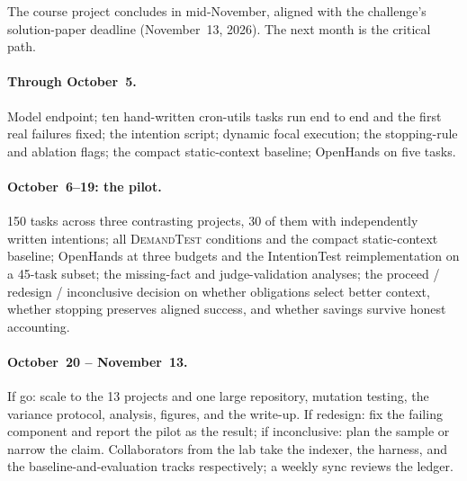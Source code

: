 \documentclass[sigconf,nonacm]{acmart}
\newcommand{\tool}{\textsc{DemandTest}\xspace}
\begin{document}
The course project concludes in mid-November, aligned with the challenge's solution-paper deadline (November~13, 2026). The next month is the critical path.

\paragraph{Through October~5.}
Model endpoint; ten hand-written cron-utils tasks run end to end and the first real failures fixed; the intention script; dynamic focal execution; the stopping-rule and ablation flags; the compact static-context baseline; OpenHands on five tasks.

\paragraph{October~6--19: the pilot.}
150 tasks across three contrasting projects, 30 of them with independently written intentions; all \tool conditions and the compact static-context baseline; OpenHands at three budgets and the IntentionTest reimplementation on a 45-task subset; the missing-fact and judge-validation analyses; the proceed / redesign / inconclusive decision on whether obligations select better context, whether stopping preserves aligned success, and whether savings survive honest accounting.

\paragraph{October~20 -- November~13.}
If go: scale to the 13 projects and one large repository, mutation testing, the variance protocol, analysis, figures, and the write-up. If redesign: fix the failing component and report the pilot as the result; if inconclusive: plan the sample or narrow the claim. Collaborators from the lab take the indexer, the harness, and the baseline-and-evaluation tracks respectively; a weekly sync reviews the ledger.



\end{document}
